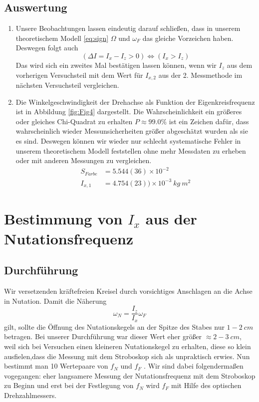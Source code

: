 \documentclass[a4paper,10pt]{article}
\begin{document}
\subsection{Auswertung}
\begin{enumerate}[label=(\alph*)]
\item Unsere Beobachtungen lassen eindeutig darauf schließen, dass in unserem theoretischem Modell \eqref{eq:sign} \(\Omega\) und \(\omega_F\) das gleiche Vorzeichen haben. Deswegen folgt auch \[(\Delta I = {I_x}-{I_z}>0 )\iff({I_x}>{I_z} )\]Das wird sich ein zweites Mal bestätigen lassen können, wenn wir \(I_z\) aus dem vorherigen Versuchsteil mit dem Wert für \(I_{x,2}\)  aus der 2. Messmethode im nächsten Versuchsteil vergleichen.


\item Die Winkelgeschwindigkeit der Drehachse als Funktion der Eigenkreisfrequenz ist in Abbildung \ref{fig:Fig4} dargestellt. Die Wahrscheinlichkeit ein größeres oder gleiches Chi-Quadrat zu erhalten
 \(P\approx  99.0 \%\) ist ein Zeichen dafür, dass wahrscheinlich wieder Messunsicherheiten größer abgeschätzt wurden als sie es sind. Deswegen können wir wieder nur schlecht systematische Fehler in unserem theoretischem Modell feststellen ohne mehr Messdaten zu erheben oder mit anderen Messungen zu vergleichen.
\begin{align*}
S_{Farbe}&=5.544(36)\times10^{-2}\\
I_{x,1}&=4.754(23))\times10^{-3}\:kg\: m^2
\end{align*}
\end{enumerate}

\section{Bestimmung von \(I_{x}\) aus der Nutationsfrequenz}
\subsection[Durchführung]{Durchführung\fnrefb}
Wir versetzenden kräftefreien Kreisel durch vorsichtiges Anschlagen an
die Achse in Nutation. Damit die Näherung 
\begin{equation} \label{eq:approx}
	\omega_N = \frac{I_z}{I_x}\omega_F
\end{equation}
gilt, sollte die Öffnung des Nutationskegels an der Spitze des Stabes nur \(1-2\:cm\) betragen. Bei unserer Durchführung war dieser Wert 
eher größer \(\approx 2-3\:cm\), weil sich bei Versuchen einen kleineren Nutationskegel zu erhalten, diese so klein ausfielen,dass die Messung mit dem Stroboskop sich als unpraktisch erwies.  Nun bestimmt man 10 Wertepaare von \(f_N\) und \(f_F\) . Wir sind dabei
folgendermaßen vogegangen: eher langsamere Messung der Nutationsfrequenz mit dem Stroboskop zu Beginn und erst bei der Festlegung von \(f_N\) wird \(f_F\)  mit Hilfe des optischen Drehzahlmessers.
\end{document}
